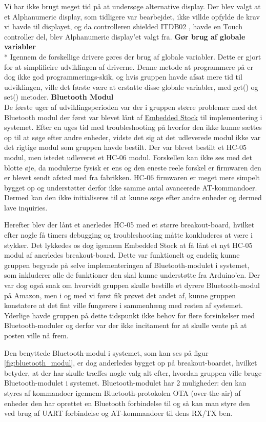 Vi har ikke brugt meget tid på at undersøge alternative display. Der blev valgt at et Alphanumeric display, som tidligere var bearbejdet, ikke villde opfylde de krav vi havde til displayet, og da controlleren shielded ITDB02 
, havde en Touch controller del, blev Alphanumeric display'et valgt fra.
\newline
\newline
\textbf{Gør brug af globale variabler} \\*
Igennem de forskellige drivere gøres der brug af globale variabler. Dette er gjort for at simplificire udviklingen af driverne. Denne metode at programmere på er dog ikke god programmerings-skik, og hvis gruppen havde afsat mere tid til udviklingen, ville det første være at erstatte disse globale variabler, med get() og set() metoder. 
\newline
\newline
\textbf{Bluetooth Modul} \\
De første uger af udviklingsperioden var der i gruppen større problemer med det Bluetooth modul der først var blevet lånt af \href{https://stockmanager.ase.au.dk/}{Embedded Stock} til implementering i systemet. Efter en uges tid med troubleshooting på hvorfor den ikke kunne sættes op til at søge efter andre enheder, vidste det sig at det udleverede modul ikke var det rigtige modul som gruppen havde bestilt. Der var blevet bestilt et HC-05 modul, men istedet udleveret et HC-06 modul. Forskellen kan ikke ses med det blotte øje, da modulerne fysisk er ens og den eneste reele forskel er firmwaren den er blevet sendt afsted med fra fabrikken. HC-06 firmwaren er meget mere simpelt bygget op og understøtter derfor ikke samme antal avancerede AT-kommandoer. Dermed kan den ikke initialiseres til at kunne søge efter andre enheder og dermed lave inquiries.

Herefter blev der lånt et anerledes HC-05 med et større breakout-board, hvilket efter nogle få timers debugging og troubleshooting måtte konkluderes at være i stykker. Det lykkedes os dog igennem Embedded Stock at få lånt et nyt HC-05 modul af anerledes breakout-board. Dette var funktionelt og endelig kunne gruppen begynde på selve implementeringen af Bluetooth-modulet i systemet, som inkluderer alle de funktioner den skal kunne understøtte fra Arduino'en. Der var dog også snak om hvorvidt gruppen skulle bestille et dyrere Bluetooth-modul på Amazon, men i og med vi først fik prøvet det andet af, kunne gruppen konstatere at det fint ville fungerere i sammenhæng med resten af systemet. Yderlige havde gruppen på dette tidspunkt ikke behov for flere forsinkelser med Bluetooth-moduler og derfor var der ikke incitament for at skulle vente på at posten ville nå frem.

Den benyttede Bluetooth-modul i systemet, som kan ses på figur \ref{fig:bluetooth_modul}, er dog anderledes bygget op på breakout-boardet, hvilket betyder, at der har skulle træffes nogle valg alt efter, hvordan gruppen ville bruge Bluetooth-modulet i systemet. Bluetooth-modulet har 2 muligheder: den kan styres af kommandoer igennem Bluetooth-protokolen OTA (over-the-air) af enheder den har oprettet en Bluetooth forbindelse til og så kan man styre den ved brug af UART forbindelse og AT-kommandoer til dens RX/TX ben.

